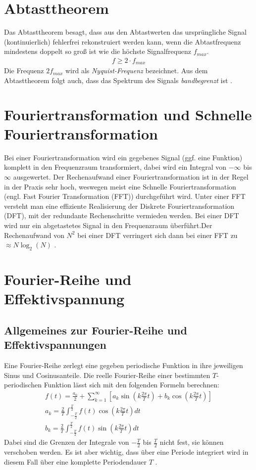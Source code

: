 \section{Abtasttheorem}
Das Abtasttheorem besagt, dass aus den Abtastwerten das ursprüngliche Signal (kontinuierlich) fehlerfrei rekonstruiert werden kann, wenn die Abtastfrequenz mindestens doppelt so groß ist wie die höchste Signalfrequenz $f_{max}$. 
\begin{gather}
    f \geq 2\cdot f_{max}
\end{gather} 
Die Frequenz $2f_{max}$ wird als \textit{Nyquist-Frequenz} bezeichnet. Aus dem Abtasttheorem folgt auch, dass das Spektrum des Signals \textit{bandbegrenzt} ist \citep{praktikum}.
\section{Fouriertransformation und Schnelle Fouriertransformation}
Bei einer Fouriertransformation wird ein gegebenes Signal (ggf. eine Funktion) komplett in den Frequenzraum transformiert, dabei wird ein Integral von $-\infty$ bis $\infty$ ausgewertet. Der Rechenaufwand einer Fouriertransformation ist in der Regel in der Praxis sehr hoch, weswegen meist eine Schnelle Fouriertransformation (engl. Fast Fourier Transformation (FFT)) durchgeführt wird. Unter einer FFT versteht man eine effiziente Realisierung der Diskrete Fouriertransformation (DFT), mit der redundante Rechenschritte vermieden werden. Bei einer DFT wird nur ein abgetastetes Signal in den Frequenzraum überführt.Der Rechenaufwand von $N^2$ bei einer DFT verringert sich dann  bei einer FFT zu $\approx N\log_2\left(N\right)$ \citep{praktikum}.
\section{Fourier-Reihe und Effektivspannung}
\label{sec:fourierseries}
\subsection*{Allgemeines zur Fourier-Reihe und Effektivspannungen}
\label{sub:fourierseriesAllgemein}
Eine Fourier-Reihe zerlegt eine gegeben periodische Funktion in ihre jeweiligen Sinus und Cosinusanteile. Die reelle Fourier-Reihe einer bestimmten $T$-periodischen Funktion lässt sich mit den folgenden Formeln berechnen:
\begin{gather}
    f(t) = \frac{a_0}{2} + \sum^{\infty}_{k=1} \left[a_k \sin(k\frac{2\pi}{T} t) +b_k \cos(k\frac{2\pi}{T} t)\right]\\
    a_k = \frac{2}{T} \int^{\frac{T}{2}}_{-\frac{T}{2}} f(t)\cos(k \frac{2\pi}{T} t)dt\\
    b_k = \frac{2}{T} \int^{\frac{T}{2}}_{-\frac{T}{2}} f(t)\sin(k \frac{2\pi}{T} t)dt
\end{gather}
Dabei sind die Grenzen der Integrale von $-\frac{T}{2}$ bis $\frac{T}{2}$ nicht fest, sie können verschoben werden. Es ist aber wichtig, dass über eine Periode integriert wird in diesem Fall über eine komplette Periodendauer $T$ \citep{praktikum}.\\

